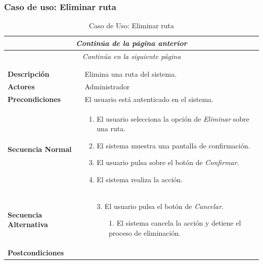 \newpage
\subsubsection*{Caso de uso: Eliminar ruta }
\begin{longtable}{| p{4cm} | p{10cm} |}
\endfirsthead
\multicolumn{2}{c}{\textit{Continúa de la página anterior}}\\[12pt]
\hline
\endhead
\hline
\multicolumn{2}{c}{\textit{Continúa en la siguiente página}} \\
\endfoot
\hline
\caption{Caso de Uso: Eliminar ruta}\label{fig:1}\\
\endlastfoot


\hline
\multicolumn{2}{|c|}{\textbf{CU$<$29$>$ - Eliminar Ruta}} \\

\hline
\textbf{Descripción} &
Elimina una ruta del sistema.\\

\hline
\textbf{Actores} &
Administrador\\

\hline
\textbf{Precondiciones} &
El usuario está autenticado en el sistema.\\

\hline
\textbf{Secuencia Normal} &\mbox{}\par\vspace{-\baselineskip}
\begin{enumerate}[leftmargin=0.7cm, topsep=0.1cm]
\item El usuario selecciona la opción de \textit{Eliminar} sobre una ruta.
\item El sistema muestra una pantalla de confirmación.
\item El usuario pulsa sobre el botón de \textit{Confirmar}.
\item El sistema realiza la acción.
\end{enumerate}


\\
\hline
\textbf{Secuencia Alternativa} &\mbox{}\par\vspace{-\baselineskip}
\begin{enumerate}[leftmargin=0.9cm, topsep=0.1cm]
\item[3.] El usuario pulsa el botón de \textit{Cancelar}.
	\begin{itemize}
	\item[1.] El sistema cancela la acción y detiene el proceso de eliminación.
	\end{itemize}
\end{enumerate}
\\

\hline
\textbf{Postcondiciones} & \\
\hline
\end{longtable}





